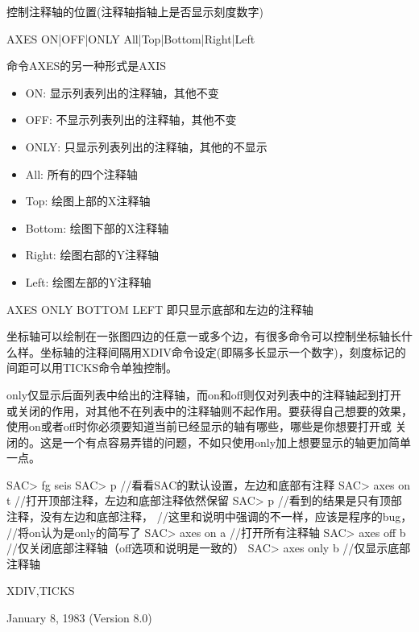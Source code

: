 \label{cmd:axes}

控制注释轴的位置(注释轴指轴上是否显示刻度数字)

AXES ON|OFF|ONLY All|Top|Bottom|Right|Left

命令AXES的另一种形式是AXIS

\begin{itemize}
\item ON: 显示列表列出的注释轴，其他不变
\item OFF: 不显示列表列出的注释轴，其他不变
\item ONLY: 只显示列表列出的注释轴，其他的不显示
\item All: 所有的四个注释轴
\item Top: 绘图上部的X注释轴
\item Bottom: 绘图下部的X注释轴
\item Right: 绘图右部的Y注释轴
\item Left: 绘图左部的Y注释轴
\end{itemize}

AXES ONLY BOTTOM LEFT	即只显示底部和左边的注释轴

坐标轴可以绘制在一张图四边的任意一或多个边，有很多命令可以控制坐标轴长什么样。坐标轴的注释间隔用XDIV命令设定(即隔多长显示一个数字)，刻度标记的间距可以用TICKS命令单独控制。

only仅显示后面列表中给出的注释轴，而on和off则仅对列表中的注释轴起到打开
或关闭的作用，对其他不在列表中的注释轴则不起作用。要获得自己想要的效果，
使用on或者off时你必须要知道当前已经显示的轴有哪些，哪些是你想要打开或
关闭的。这是一个有点容易弄错的问题，不如只使用only加上想要显示的轴更加简单一点。

\begin{SACCode}
SAC> fg seis
SAC> p           //看看SAC的默认设置，左边和底部有注释
SAC> axes on t   //打开顶部注释，左边和底部注释依然保留
SAC> p           //看到的结果是只有顶部注释，没有左边和底部注释，
                 //这里和说明中强调的不一样，应该是程序的bug，
                 //将on认为是only的简写了
SAC> axes on a   //打开所有注释轴
SAC> axes off b  //仅关闭底部注释轴（off选项和说明是一致的）
SAC> axes only b //仅显示底部注释轴
\end{SACCode}

XDIV,TICKS

January 8, 1983 (Version 8.0)

